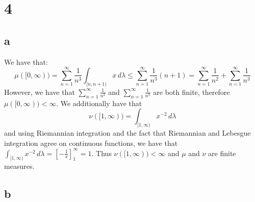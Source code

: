 \documentclass{article}
\theoremstyle{definition}
\numberwithin{theorem}{section}
\numberwithin{equation}{section}
\begin{document}
\section{4}

\subsection{a}
We have that:
\begin{equation}
	\mu([0, \infty)) = \sum_{n = 1}^{\infty} \frac{1}{n^3} \int_{[n, n + 1)} x \, d\lambda \leq \sum_{n = 1}^{\infty} \frac{1}{n^3} (n + 1) = \sum_{n = 1}^{\infty} \frac{1}{n^2} + \sum_{n = 1}^{\infty} \frac{1}{n^3}
\end{equation}
However, we have that $\sum_{n = 1}^{\infty} \frac{1}{n^2}$ and $\sum_{n = 1}^{\infty} \frac{1}{n^3}$ are both finite, therefore $\mu([0, \infty)) < \infty$. 
We additionally have that
\begin{equation}
	\nu([1, \infty)) = \int_{[1, \infty)} x^{-2} \, d\lambda
\end{equation}
and using Riemannian integration and the fact that Riemannian and Lebesgue integration agree on continuous functions, we have that $\int_{[1, \infty)} x^{-2} \, d\lambda = \left[ -\frac{1}{x} \right]^\infty_{1} = 1$. Thus $\nu([1, \infty)) < \infty$ and $\mu$ and $\nu$ are finite measures. 
\subsection{b}
\end{document}
